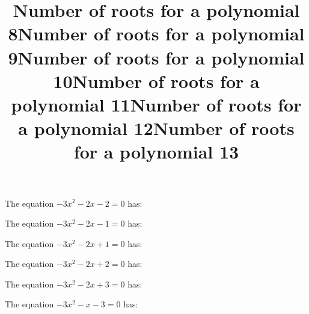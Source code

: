 \documentclass{article}
\begin{document}
\begin{category}
\begin{question}[multichoice]


\end{question}
\begin{question}[multichoice]
\title{Number of roots for a polynomial 8}
The equation $- 3 x^{2} - 2 x - 2=0$ has:



\end{question}
\begin{question}[multichoice]
\title{Number of roots for a polynomial 9}
The equation $- 3 x^{2} - 2 x - 1=0$ has:



\end{question}
\begin{question}[multichoice]
\title{Number of roots for a polynomial 10}
The equation $- 3 x^{2} - 2 x + 1=0$ has:



\end{question}
\begin{question}[multichoice]
\title{Number of roots for a polynomial 11}
The equation $- 3 x^{2} - 2 x + 2=0$ has:



\end{question}
\begin{question}[multichoice]
\title{Number of roots for a polynomial 12}
The equation $- 3 x^{2} - 2 x + 3=0$ has:



\end{question}
\begin{question}[multichoice]
\title{Number of roots for a polynomial 13}
The equation $- 3 x^{2} - x - 3=0$ has:




\end{question}
\end{category}
\end{document}
